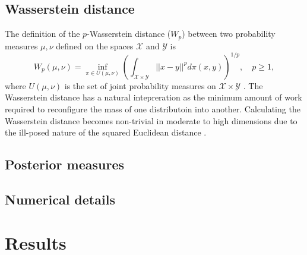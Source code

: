 \documentclass[12pt]{article}
\begin{document}
\subsection{Wasserstein distance}
The definition of the $p$-Wasserstein distance ($W_p$) between two probability
measures $\mu, \nu$ defined on the spaces $\mathcal{X}$ and $\mathcal{Y}$ is 
\begin{equation}
W_p(\mu, \nu) = \inf_{\pi \in U(\mu, \nu)} \left(\int_{\mathcal{X} \times \mathcal{Y}}||x-y||^pd\pi(x, y) \right)^{1/p}, \quad p\geq 1,
\label{wasser:ana}
\end{equation}
where $U(\mu, \nu)$ is the set of joint probability measures on
$\mathcal{X}\times \mathcal{Y}$ \citep{villaniOptimalTransportOld2009}. The
Wasserstein distance has a natural intepreration as the minimum amount of work
required to reconfigure the mass of one distributoin into another. Calculating
the Wasserstein distance becomes non-trivial in moderate to high dimensions due
to the ill-posed nature of the squared Euclidean distance
\citep{cuturiMongeBregmanOccam2023}. 

\subsection{Posterior measures}

\subsection{Numerical details}

\section{Results}
\end{document}
